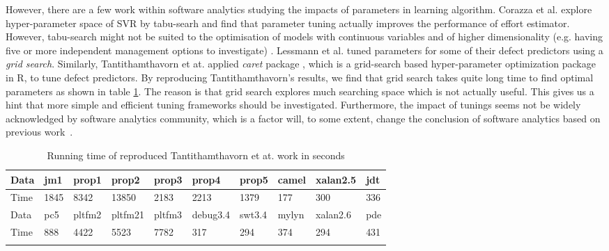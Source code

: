 However, there are a few work within software analytics studying 
the impacts of parameters in learning algorithm. Corazza et al.\cite{corazza2010effective} 
explore hyper-parameter space of SVR by tabu-searh and find that parameter tuning
actually improves the performance of effort estimator. However, 
tabu-search might not be suited to the optimisation of models
with continuous variables and of higher dimensionality 
(e.g. having five or more independent management options to
investigate) \cite{mayer1998tabu}. Lessmann et al.\cite{lessmann2008benchmarking}
tuned parameters for some of their defect predictors using  a {\em grid search}.
Similarly, Tantithamthavorn et at.\cite{tantithamthavorn2016automated} 
applied {\em caret} package \cite{kuhn2008caret}, which is a grid-search 
based hyper-parameter optimization package in R,  to tune defect predictors.
By reproducing Tantithamthavorn's results,  
we find that grid search takes quite long time to find 
optimal parameters as shown in table \ref{tab:grid_runtime}. 
The reason is that grid search explores much searching space which is not actually useful. 
This gives us a hint that  more simple and efficient tuning frameworks should be investigated.
Furthermore, the impact of tunings seems not be widely acknowledged by
software analytics community, which is a factor will, to some extent, change
the conclusion of software analytics based on previous work~\cite{mayer1998tabu,tantithamthavorn2016automated}.


 \begin{table}[!h]
\renewcommand{\baselinestretch}{0.5}
\renewcommand{\arraystretch}{3}
\scriptsize
\centering
  \begin{tabular}{p{0.25cm}p{0.25cm}p{0.5cm}p{0.5cm}p{0.5cm}p{0.5cm}p{0.5cm}p{0.35cm}p{0.5cm}p{0.35cm}}\hline \hline
  Data &jm1&prop1&prop2&prop3&prop4&prop5&camel&xalan2.5&jdt
\\\hline 
  Time &1845 &8342 &13850 &2183 &2213 &1379 &177 &300 &336
\\ \hline \hline
  Data &pc5&pltfm2&pltfm21&pltfm3&debug3.4&swt3.4&mylyn&xalan2.6 & pde
\\\hline 
  Time &888 &4422 &5523 &7782 &317  &294 &374  &294 & 431
\\ \hline\hline
\\  \end{tabular}

   \caption{ Running time of reproduced Tantithamthavorn et at.\cite{tantithamthavorn2016automated} work in seconds
   }\label{tab:grid_runtime}
\end{table} 

